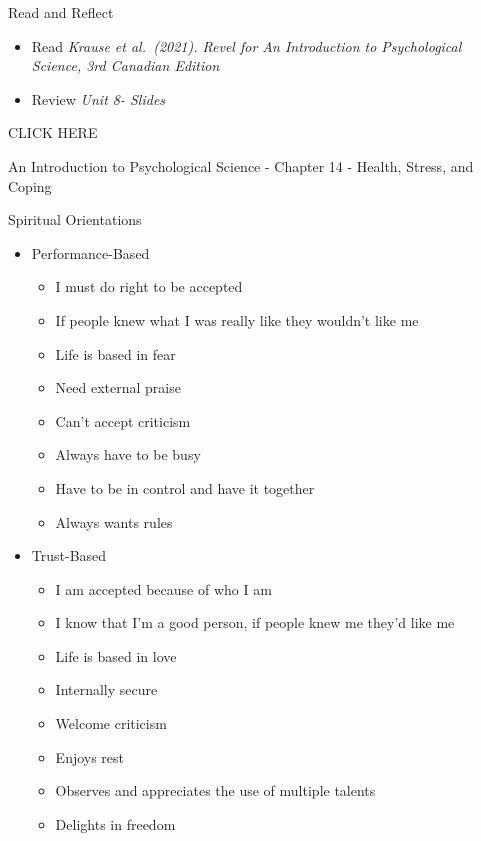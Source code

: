 \documentclass[
]{book}
\providecommand{\tightlist}{%
  \setlength{\itemsep}{0pt}\setlength{\parskip}{0pt}}
\begin{document}
\begin{reflect}
{Read and Reflect}

\begin{itemize}
\tightlist
\item
  Read \emph{Krause et al.~(2021). Revel for An Introduction to Psychological Science, 3rd Canadian Edition}\\
\item
  Review \emph{Unit 8- Slides}
\end{itemize}

CLICK HERE

An Introduction to Psychological Science - Chapter 14 - Health, Stress, and Coping

Spiritual Orientations

\begin{itemize}
\tightlist
\item
  Performance-Based

  \begin{itemize}
  \tightlist
  \item
    I must do right to be accepted\\
  \item
    If people knew what I was really like they wouldn't like me\\
  \item
    Life is based in fear\\
  \item
    Need external praise\\
  \item
    Can't accept criticism\\
  \item
    Always have to be busy\\
  \item
    Have to be in control and have it together\\
  \item
    Always wants rules\\
  \end{itemize}
\item
  Trust-Based

  \begin{itemize}
  \tightlist
  \item
    I am accepted because of who I am\\
  \item
    I know that I'm a good person, if people knew me they'd like me\\
  \item
    Life is based in love\\
  \item
    Internally secure\\
  \item
    Welcome criticism\\
  \item
    Enjoys rest\\
  \item
    Observes and appreciates the use of multiple talents\\
  \item
    Delights in freedom
  \end{itemize}
\end{itemize}


\end{reflect}
\end{document}
